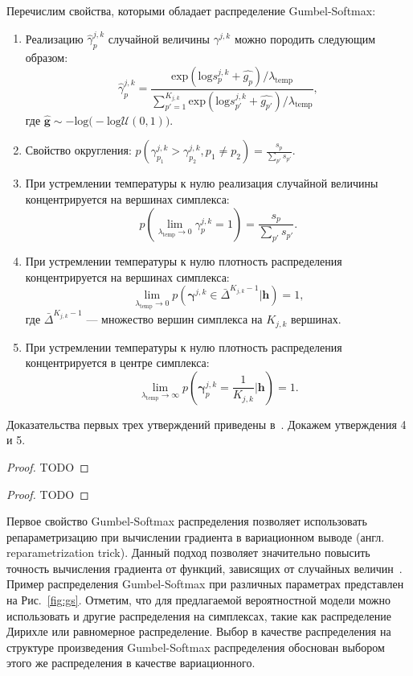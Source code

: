 Перечислим свойства, которыми обладает распределение Gumbel-Softmax:
\begin{enumerate}
\item Реализацию $\hat{\gamma}^{j,k}_p $ случайной величины $\gamma^{j,k}$  можно породить следующим образом:
\[
    \hat{\gamma}^{j,k}_p = \frac{\text{exp}(\text{log}s^{j,k}_p+\hat{g_p})/\lambda_{\text{temp}}}{\sum_{p'=1}^{K_{j,k}}\text{exp}(\text{log}s^{j,k}_{p'}+\hat{g_{p'}})/\lambda_{\text{temp}}},
\]
где $\hat{\mathbf{g}} \sim -\text{log}\bigl(-\text{log}\mathcal{U}(0,1)\bigr).$ 

\item Свойство округления: $p(\gamma^{j,k}_{p_1} > \gamma^{j,k}_{p_2}, p_1\neq p_2) = \frac{s_p}{\sum_{p'}s_{p'}}.$

\item При устремлении температуры к нулю реализация случайной величины концентрируется на вершинах симплекса:
\[
    p(\lim_{\lambda_{\text{temp}} \to 0}  \gamma^{j,k}_{p} = 1)  = \frac{s_p}{\sum_{p'}s_{p'}}.
\]
\item При устремлении температуры к нулю плотность распределения концентрируется на вершинах симплекса:
\[
    \lim_{\lambda_{\text{temp}} \to 0}  p(\boldsymbol{\gamma}^{j,k} \in \bar{\Delta}^{K_{j,k}-1}|\mathbf{h}) = 1,
\]
где $\bar{\Delta}^{K_{j,k}-1}$ --- множество вершин симплекса на  $K_{j,k}$ вершинах.

\item При устремлении температуры к нулю плотность распределения концентрируется в центре симплекса:
\[
    \lim_{\lambda_{\text{temp}} \to \infty}  p\left(\boldsymbol{\gamma}^{j,k}_p = \frac{1}{K_{j,k}}\Bigg|\mathbf{h}\right) = 1.
\]
\end{enumerate}

Доказательства первых трех утверждений приведены в~\cite{gumbel}. Докажем утверждения 4 и 5.

\begin{proof}
TODO
\end{proof}


\begin{proof}
TODO
\end{proof}

Первое свойство Gumbel-Softmax распределения позволяет использовать репараметризацию при вычислении градиента в вариационном выводе (англ. reparametrization trick). Данный подход позволяет значительно повысить точность вычисления градиента от функций, зависящих от случайных величин~\cite{reparametrization}.
Пример распределения Gumbel-Softmax при различных параметрах представлен на Рис.~\ref{fig:gs}. Отметим, что для предлагаемой вероятностной модели можно использовать и другие распределения на симплексах, такие как распределение Дирихле или равномерное распределение. Выбор в качестве распределения на структуре произведения Gumbel-Softmax распределения обоснован выбором этого же распределения в качестве вариационного.

